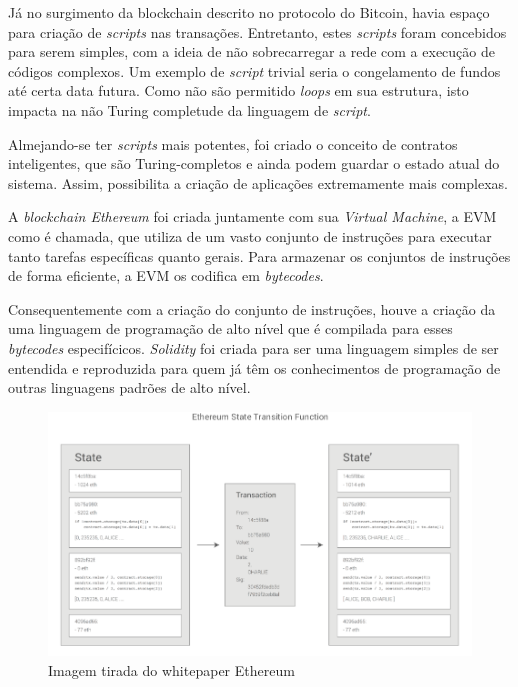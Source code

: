 \documentclass{ufsctex/ufsctex}
\begin{document}
Já no surgimento da blockchain descrito no protocolo do Bitcoin, havia espaço para 
criação de \textit{scripts} nas transações. Entretanto, estes \textit{scripts} foram concebidos
para serem simples, com a ideia de não sobrecarregar a rede com a execução de códigos
complexos. Um exemplo de \textit{script} trivial seria o congelamento de fundos até
certa data futura. Como não são  permitido \textit{loops} em sua estrutura, isto impacta
na não Turing completude da linguagem de \textit{script}.\cite{nakamoto2012bitcoin}

Almejando-se ter \textit{scripts} mais potentes, foi criado o conceito de contratos
inteligentes, que são Turing-completos e ainda podem guardar o estado atual do sistema.
Assim, possibilita a criação de aplicações extremamente mais complexas.\cite{ethereum}

A \textit{blockchain Ethereum} foi criada juntamente com sua \textit{Virtual Machine}, a
EVM como é chamada, que utiliza de um vasto conjunto
de instruções para executar tanto tarefas específicas quanto gerais. Para armazenar os
conjuntos de instruções de forma eficiente, a EVM os codifica em \textit{bytecodes}.\cite{wood2014yellow}

Consequentemente com a criação do conjunto de instruções, houve a criação da uma linguagem
de programação de alto nível que é compilada para esses \textit{bytecodes} especifícicos.
\textit{Solidity} foi criada para ser uma linguagem simples de ser entendida e reproduzida
para quem já têm os conhecimentos de programação de outras linguagens padrões de alto nível.
\cite{solidity}

\begin{figure}[h]
	\centering
	\includegraphics[scale=0.3]{ethereum}
	\caption{Imagem tirada do whitepaper Ethereum}
	\label{fig:ethereum}
\end{figure}
\end{document}
